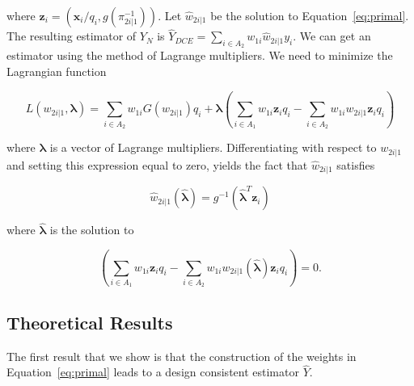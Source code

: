 \documentclass[12pt]{article}
\renewcommand{\bf}[1]{\mathbf{#1}}
\begin{document}
where  $\bf z_i = (\bf x_i / q_i, g(\pi_{2i|1}^{-1}))$. 
Let $\hat w_{2i|1}$ be the solution to Equation~\eqref{eq:primal}. The resulting 
estimator of $Y_N$ is $\hat Y_{DCE} = \sum_{i \in A_2} w_{1i} \hat w_{2i|1} y_i$.
We can get an estimator using the method of Lagrange multipliers. We need to
minimize the Lagrangian function

\begin{equation}\label{eq:legragedc1}
  L(w_{2i|1}, \bm \lambda) = \sum_{i \in A_2} w_{1i} G(w_{2i|1}) q_i 
  + \bm \lambda \left( \sum_{i \in A_1} w_{1i} \bf z_i q_i -
    \sum_{i \in A_2} w_{1i} w_{2i|1} \bf z_i q_i\right)
\end{equation}

where $\bm \lambda$ is a vector of Lagrange multipliers.
Differentiating with respect to $w_{2i|1}$ and setting this expression equal to
zero, yields the fact that $\hat w_{2i|1}$ satisfies 

$$ \hat w_{2i|1}(\hat{\bm \lambda}) = g^{-1}(\hat{\bm \lambda}^T \bf z_i) $$

where $\hat{\bm \lambda}$ is the solution to

\begin{equation}\label{eq:lamdc1}
  \left( \sum_{i \in A_1} w_{1i} \bf z_i q_i -
  \sum_{i \in A_2} w_{1i} w_{2i|1}(\hat{\bm \lambda}) \bf z_i q_i\right) = 0.
\end{equation}

\subsection{Theoretical Results}

The first result that we show is that the construction of the weights in
Equation~\ref{eq:primal} leads to a design consistent estimator $\hat Y$.
\end{document}
